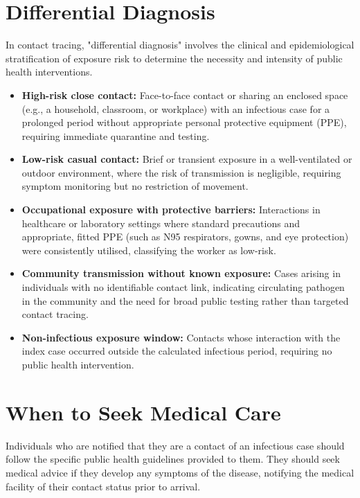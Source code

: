 \section*{Differential Diagnosis}
In contact tracing, "differential diagnosis" involves the clinical and epidemiological stratification of exposure risk to determine the necessity and intensity of public health interventions.

\begin{itemize}
    \item \textbf{High-risk close contact:} Face-to-face contact or sharing an enclosed space (e.g., a household, classroom, or workplace) with an infectious case for a prolonged period without appropriate personal protective equipment (PPE), requiring immediate quarantine and testing.
    \item \textbf{Low-risk casual contact:} Brief or transient exposure in a well-ventilated or outdoor environment, where the risk of transmission is negligible, requiring symptom monitoring but no restriction of movement.
    \item \textbf{Occupational exposure with protective barriers:} Interactions in healthcare or laboratory settings where standard precautions and appropriate, fitted PPE (such as N95 respirators, gowns, and eye protection) were consistently utilised, classifying the worker as low-risk.
    \item \textbf{Community transmission without known exposure:} Cases arising in individuals with no identifiable contact link, indicating circulating pathogen in the community and the need for broad public testing rather than targeted contact tracing.
    \item \textbf{Non-infectious exposure window:} Contacts whose interaction with the index case occurred outside the calculated infectious period, requiring no public health intervention.
\end{itemize}

\section*{When to Seek Medical Care}
Individuals who are notified that they are a contact of an infectious case should follow the specific public health guidelines provided to them. They should seek medical advice if they develop any symptoms of the disease, notifying the medical facility of their contact status prior to arrival.


